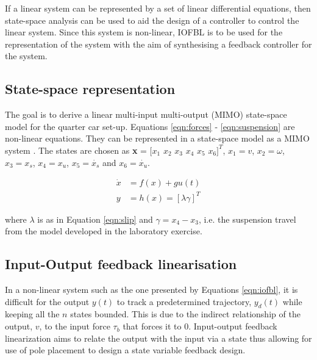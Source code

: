 \documentclass[10pt,twocolumn]{witseiepaper}
\begin{document}
If a linear system can be represented by a set of linear differential equations, then state-space analysis can be used to aid the design of a controller to control the linear system. Since this system is non-linear, IOFBL is to be used for the representation of the system with the aim of synthesising a feedback controller for the system.

\subsection{State-space representation}

The goal is to derive a linear multi-input multi-output (MIMO) state-space model for the quarter car set-up. Equations \ref{eqn:forces} - \ref{eqn:suspension}  are non-linear equations. They can be represented in a state-space model as a MIMO system \cite{Nyandoro2:2011}. The states are chosen as \textbf{x} = $[x_1$ $x_2$ $x_3$ $x_4$ $x_5$ $x_6]^T$,  $x_1 = v$, $x_2 = \omega$, $x_3 = x_s$, $x_4 = x_u$, $x_5 = \dot{x_s}$ and $x_6 = \dot{x_u}$.

\begin{equation}
	\begin{align}
		\dot{x} &= f(x)+gu(t) \\
		y &= h(x)=[\lambda \gamma]^T
 	\end{align}
	\label{eqn:iofbl}
\end{equation}

where $\lambda$ is as in Equation \ref{eqn:slip} and $\gamma = x_4 - x_3$, i.e. the suspension travel from the model developed in the laboratory exercise.

\subsection{Input-Output feedback linearisation}

In a non-linear system such as the one presented by Equations \ref{eqn:iofbl}, it is difficult for the output $y(t)$ to track a predetermined  trajectory, $y_d(t)$ while keeping all the $n$ states bounded. This is due to the indirect relationship of the output, $v$, to the input force $\tau _b$ that forces it to $0$. Input-output feedback linearization aims to relate the output with the input via a state \cite{Nyandoro2:2011, Iraj:2008} thus allowing for use of pole placement to design a state variable feedback design. 
\end{document}
